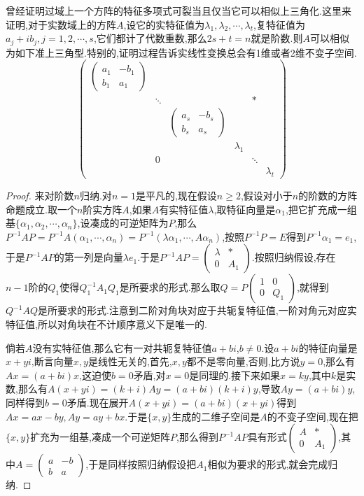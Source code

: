 曾经证明过域上一个方阵的特征多项式可裂当且仅当它可以相似上三角化.这里来证明,对于实数域上的方阵$A$,设它的实特征值为$\lambda_1,\lambda_2,\cdots,\lambda_t$,复特征值为$a_j+ib_j,j=1,2,\cdots,s$,它们都计了代数重数,那么$2s+t=n$就是阶数.则$A$可以相似为如下准上三角型.特别的,证明过程告诉实线性变换总会有1维或者2维不变子空间.
$$\left(\begin{array}{cccccc}
\left(\begin{array}{cc}
a_1&-b_1\\
b_1&a_1\end{array}\right)&&&&&\\
&\ddots&&&*&\\
&&\left(\begin{array}{cc}
a_s&-b_s\\
b_s&a_s\end{array}\right)&&&\\
&&&\lambda_1&&\\
&0&&&\ddots&\\
&&&&&\lambda_t\end{array}\right)$$
\begin{proof}
	
	来对阶数$n$归纳.对$n=1$是平凡的,现在假设$n\ge2$,假设对小于$n$的阶数的方阵命题成立.取一个$n$阶实方阵$A$,如果$A$有实特征值$\lambda$,取特征向量是$\alpha_1$,把它扩充成一组基$\{\alpha_1,\alpha_2,\cdots,\alpha_n\}$,设凑成的可逆矩阵为$P$,那么$P^{-1}AP=P^{-1}A(\alpha_1,\cdots,\alpha_n)=P^{-1}(\lambda\alpha_1,\cdots,A\alpha_n)$,按照$P^{-1}P=E$得到$P^{-1}\alpha_1=e_1$,于是$P^{-1}AP$的第一列是向量$\lambda e_1$.于是$P^{-1}AP=\left(\begin{array}{cc}
	\lambda&*\\
	0&A_1\end{array}\right)$.按照归纳假设,存在$n-1$阶的$Q_1$使得$Q_1^{-1}A_1Q_1$是所要求的形式.那么取$Q=P\left(\begin{array}{cc}
	1&0\\
	0&Q_1\end{array}\right)$,就得到$Q^{-1}AQ$是所要求的形式.注意到二阶对角块对应于共轭复特征值,一阶对角元对应实特征值,所以对角块在不计顺序意义下是唯一的.
	
	倘若$A$没有实特征值,那么它有一对共轭复特征值$a+bi$,$b\not=0$.设$a+bi$的特征向量是$x+yi$,断言向量$x,y$是线性无关的,首先,$x,y$都不是零向量,否则,比方说$y=0$,那么有$Ax=(a+bi)x$,这迫使$b=0$矛盾,对$x=0$是同理的.接下来如果$x=ky$,其中$k$是实数,那么有$A(x+yi)=(k+i)Ay=(a+bi)(k+i)y$,导致$Ay=(a+bi)y$,同样得到$b=0$矛盾.现在展开$A(x+yi)=(a+bi)(x+yi)$得到$Ax=ax-by,Ay=ay+bx$.于是$\{x,y\}$生成的二维子空间是$A$的不变子空间,现在把$\{x,y\}$扩充为一组基,凑成一个可逆矩阵$P$,那么得到$P^{-1}AP$具有形式$\left(\begin{array}{cc}
	A&*\\
	0&A_1\end{array}\right)$,其中$A=\left(\begin{array}{cc}
	a&-b\\
	b&a\end{array}\right)$,于是同样按照归纳假设把$A_1$相似为要求的形式,就会完成归纳.
	
\end{proof}

